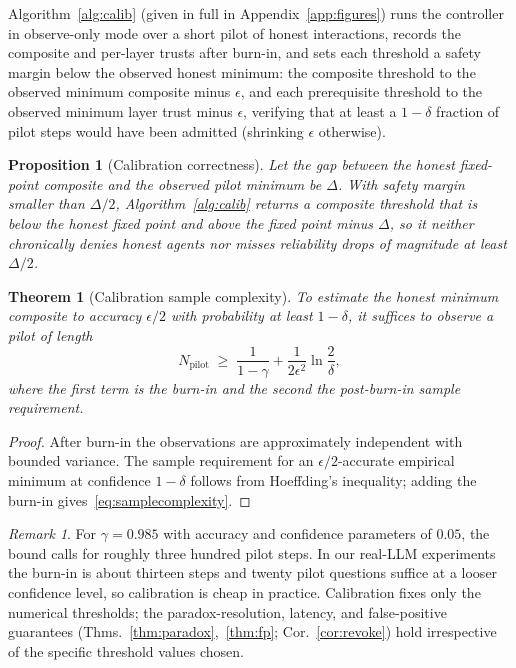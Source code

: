 \documentclass[sigconf,anonymous]{acmart}
\theoremstyle{plain}
\newtheorem{theorem}{Theorem}
\newtheorem{proposition}{Proposition}
\theoremstyle{definition}
\theoremstyle{remark}
\newtheorem{remark}{Remark}
\begin{document}
Algorithm~\ref{alg:calib} (given in full in Appendix~\ref{app:figures}) runs the
controller in observe-only mode over a short pilot of honest interactions, records the
composite and per-layer trusts after burn-in, and sets each threshold a safety margin
below the observed honest minimum: the composite threshold to the observed minimum
composite minus $\epsilon$, and each prerequisite threshold to the observed minimum layer
trust minus $\epsilon$, verifying that at least a $1-\delta$ fraction of pilot steps would
have been admitted (shrinking $\epsilon$ otherwise).

\begin{proposition}[Calibration correctness]
\label{prop:calibcorrect}
Let the gap between the honest fixed-point composite and the observed pilot minimum be
$\Delta$. With safety margin smaller than $\Delta/2$, Algorithm~\ref{alg:calib} returns a
composite threshold that is below the honest fixed point and above the fixed point minus
$\Delta$, so it neither chronically denies honest agents nor misses reliability drops of
magnitude at least $\Delta/2$.
\end{proposition}

\begin{theorem}[Calibration sample complexity]
\label{thm:sample}
To estimate the honest minimum composite to accuracy $\epsilon/2$ with probability at least
$1-\delta$, it suffices to observe a pilot of length
\begin{equation}
N_{\mathrm{pilot}}\;\ge\;\frac{1}{1-\gamma}+\frac{1}{2\epsilon^2}\ln\frac{2}{\delta},
\label{eq:samplecomplexity}
\end{equation}
where the first term is the burn-in and the second the post-burn-in sample requirement.
\end{theorem}
\begin{proof}
After burn-in the observations are approximately independent with bounded variance. The
sample requirement for an $\epsilon/2$-accurate empirical minimum at confidence $1-\delta$
follows from Hoeffding's inequality; adding the burn-in gives~\eqref{eq:samplecomplexity}.
\end{proof}

\begin{remark}
For $\gamma=0.985$ with accuracy and confidence parameters of $0.05$, the bound calls for
roughly three hundred pilot steps. In our real-LLM experiments the burn-in is about
thirteen steps and twenty pilot questions suffice at a looser confidence level, so
calibration is cheap in practice. Calibration fixes only the numerical thresholds; the
paradox-resolution, latency, and false-positive guarantees
(Thms.~\ref{thm:paradox},~\ref{thm:fp}; Cor.~\ref{cor:revoke}) hold irrespective of the
specific threshold values chosen.
\end{remark}
\end{document}
